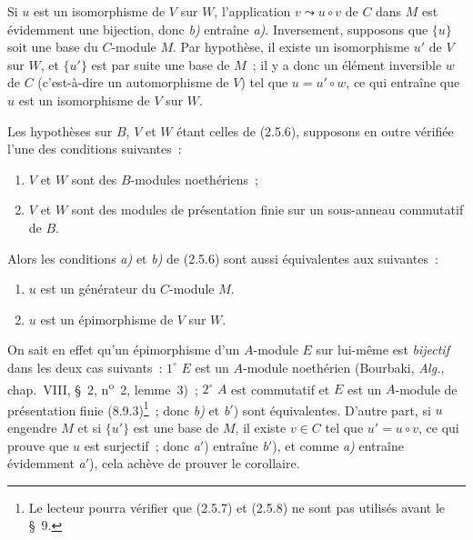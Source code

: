 Si $u$ est un isomorphisme de $V$ sur $W$, l'application
$v\leadsto u\circ v$ de $C$ dans $M$ est évidemment une bijection, donc
\emph{b)} entraîne \emph{a)}. Inversement, supposons que $\{u\}$ soit une
base du $C$-module $M$. Par hypothèse, il existe un isomorphisme $u'$ de $V$
sur $W$, et $\{u'\}$ est par suite une base de $M$~; il y a donc un élément
inversible $w$ de $C$ (c'est-à-dire un automorphisme de $V$) tel que
$u=u'\circ w$, ce qui entraîne que $u$ est un isomorphisme de $V$ sur $W$.

\begin{corollary}[2.5.7]
\label{IV.2.5.7-fr}
Les hypothèses sur $B$, $V$ et $W$ étant celles de \textup{(2.5.6)}, supposons en
outre vérifiée l'une des conditions suivantes~:
\begin{enumerate}
\item[\textup{(i)}] $V$ et $W$ sont des $B$-modules noethériens~;
\item[\textup{(ii)}] $V$ et $W$ sont des modules de présentation finie sur un
sous-anneau commutatif de $B$.
\end{enumerate}
Alors les conditions \emph{a)} et \emph{b)} de \textup{(2.5.6)} sont aussi
équivalentes aux suivantes~:
\begin{enumerate}
\item[\emph{a}$'$)] $u$ est un générateur du $C$-module $M$.
\item[\emph{b}$'$)] $u$ est un épimorphisme de $V$ sur $W$.
\end{enumerate}
\end{corollary}

On sait en effet qu'un épimorphisme d'un $A$-module $E$ sur lui-même est
\emph{bijectif} dans les deux cas suivants~: $1^\circ$ $E$ est un $A$-module
noethérien (Bourbaki, \emph{Alg.}, chap.~VIII, \S~2,
n\textsuperscript{o}~2, lemme~3)~; $2^\circ$ $A$ est commutatif et $E$ est
un $A$-module de présentation finie (8.9.3)\footnote{Le lecteur pourra
vérifier que (2.5.7) et (2.5.8) ne sont pas utilisés avant le \S~9.}~; donc
\emph{b)} et \emph{b}$'$) sont équivalentes. D'autre part, si $u$ engendre
$M$
et si $\{u'\}$ est une base de $M$, il existe $v\in C$ tel que
$u'=u\circ v$, ce qui prouve que $u$ est surjectif~; donc \emph{a}$'$)
entraîne \emph{b}$'$), et comme \emph{a)} entraîne évidemment
\emph{a}$'$), cela achève de prouver le corollaire.

